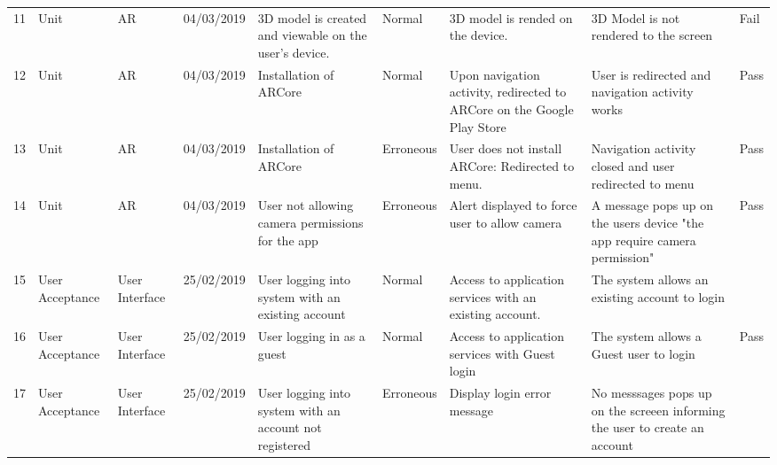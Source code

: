 \begin{adjustbox}{angle=90}
\begin{tabular}{l|l|l|l|p{3cm}|l|p{3cm}|p{3cm}|l}
11      & Unit                          & AR                 & 04/03/2019     & 3D model is created and viewable on the user's device.                        & Normal    & 3D model is rended on the device.                                            & 3D Model is not rendered to the screen                                      & Fail        \\
12      & Unit                          & AR                 & 04/03/2019     & Installation of ARCore                                                        & Normal    & Upon navigation activity, redirected to ARCore on the Google Play Store      & User is redirected and navigation activity works                            & Pass        \\
13      & Unit                          & AR                 & 04/03/2019     & Installation of ARCore                                                        & Erroneous & User does not install ARCore: Redirected to menu.                            & Navigation activity closed and user redirected to menu                      & Pass        \\
14      & Unit                          & AR                 & 04/03/2019     & User not allowing camera permissions for the app                              & Erroneous & Alert displayed to force user to allow camera                                & A message pops up on the users device "the app require camera permission"   & Pass        \\
15      & User Acceptance               & User Interface     & 25/02/2019     & User logging into system with an existing account                             & Normal    & Access to application services with an existing account.                     & The system allows an existing account to login                              &             \\
16      & User Acceptance               & User Interface     & 25/02/2019     & User logging in as a guest                                                    & Normal    & Access to application services with Guest login                              & The system allows a Guest user  to login                                    & Pass        \\
17      & User Acceptance               & User Interface     & 25/02/2019     & User logging into system with an account not registered                       & Erroneous & Display login error message                                                  & No messsages pops up on the screeen informing the user to create an account &             \\

\end{tabular}
\end{adjustbox}
